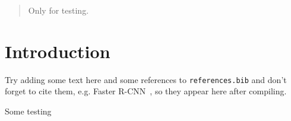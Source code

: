 \documentclass[12pt]{article}
\begin{document}
\maketitle

\begin{abstract}
Only for testing.
\end{abstract}

\section{Introduction}
Try adding some text here and some references to \texttt{references.bib} and don't forget to cite them, e.g. Faster R-CNN~\cite{ren2016faster}, so they appear here after compiling.

Some testing



\end{document}
